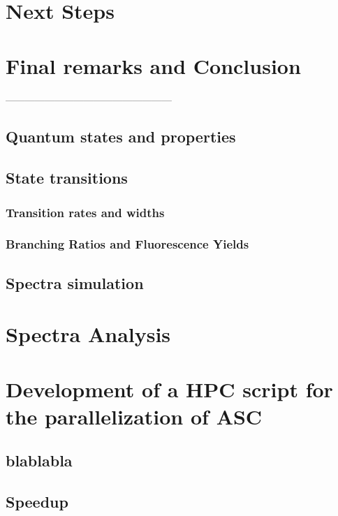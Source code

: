 \chapter{Next Steps}
\chapter{Final remarks and Conclusion}
---------------------------------------------------


\section{Quantum states and properties}

\section{State transitions}

\subsection{Transition rates and widths}
\subsection{Branching Ratios and Fluorescence Yields}

\section{Spectra simulation}

\chapter{Spectra Analysis}

\chapter{Development of a \gls{HPC} script for the parallelization of \gls{ASC}}

\section{blablabla}

\section{Speedup}


